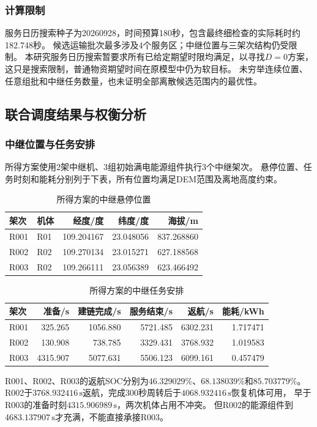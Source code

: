\documentclass[bwprint]{gmcmthesis}
\begin{document}
\subsubsection{计算限制}
服务日历搜索种子为20260928，时间预算180秒，包含最终细检查的实际耗时约182.748秒。
候选运输批次最多涉及4个服务区；中继位置与三架次结构仍受限制。
本研究服务日历搜索暂要求所有已给定期望时限均满足，以寻找$D=0$方案，
这只是搜索限制，普通物资期望时间在原模型中仍为软目标。
未穷举连续位置、任意组批和中继任务数量，也未证明全部离散候选范围内的最优性。

\subsection{联合调度结果与权衡分析}
\subsubsection{中继位置与任务安排}
所得方案使用2架中继机、3组初始满电能源组件执行3个中继架次。
悬停位置、任务时刻和能耗分别列于下表，所有位置均满足DEM范围及离地高度约束。
\begin{table}[htbp]
\centering
\small
\caption{所得方案的中继悬停位置}
\label{tab:q3_locations}
\begin{tabular}{llrrr}
\toprule
架次 & 机体 & 经度/度 & 纬度/度 & 海拔/m \\
\midrule
R001 & R01 & 109.204167 & 23.048056 & 837.268860 \\
R002 & R02 & 109.270134 & 23.015271 & 627.188568 \\
R003 & R02 & 109.266111 & 23.056389 & 623.466492 \\
\bottomrule
\end{tabular}
\end{table}
\begin{table}[htbp]
\centering
\small
\caption{所得方案的中继任务安排}
\label{tab:q3_relay_schedule}
\begin{tabular}{lrrrrr}
\toprule
架次 & 准备/s & 建链完成/s & 服务结束/s & 返航/s & 能耗/kWh \\
\midrule
R001 & 325.265 & 1056.880 & 5721.485 & 6302.231 & 1.717471 \\
R002 & 130.908 & 738.785 & 3329.431 & 3768.932 & 1.019583 \\
R003 & 4315.907 & 5077.631 & 5506.123 & 6099.161 & 0.457479 \\
\bottomrule
\end{tabular}
\end{table}

R001、R002、R003的返航SOC分别为$46.329029\%$、$68.138039\%$和$85.703779\%$。
R002于$3768.932416\,\mathrm{s}$返航，完成300秒周转后于$4068.932416\,\mathrm{s}$恢复机体可用，
早于R003的准备时刻$4315.906989\,\mathrm{s}$，两次机体占用不冲突。
但R002的能源组件到$4683.137907\,\mathrm{s}$才充满，不能直接承接R003。
\end{document}
